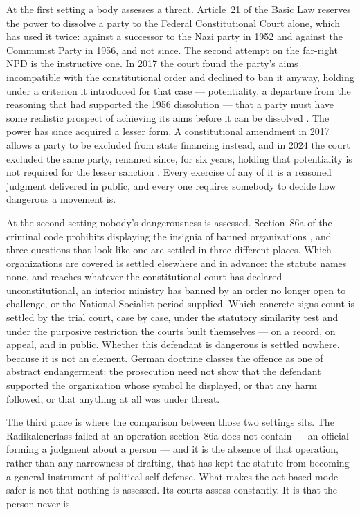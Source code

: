 At the first setting a body assesses a threat. Article~21 of the Basic Law reserves the power to dissolve a party to the Federal Constitutional Court alone, which has used it twice: against a successor to the Nazi party in 1952 and against the Communist Party in 1956, and not since. The second attempt on the far-right NPD is the instructive one. In 2017 the court found the party's aims incompatible with the constitutional
order and declined to ban it anyway, holding under a criterion it introduced for that case — potentiality, a departure from the reasoning that had supported the 1956 dissolution — that a party must have some realistic prospect of achieving its aims before it can be dissolved \autocite{bverfg2017npd,molier2018germanys}. The power has since acquired a lesser form. A constitutional amendment in 2017 allows a party to be excluded from state financing instead, and in 2024 the court excluded the same party, renamed since, for six years, holding that potentiality is not required for the lesser sanction \autocite{bverfg2024heimat}. Every exercise of any of it is a reasoned judgment delivered in public, and every one requires somebody to decide how dangerous a movement is.

At the second setting nobody's dangerousness is assessed. Section~86a of the criminal code prohibits displaying the insignia of banned organizations \autocite{germany1998stgb}, and three questions that look like one are settled in three different places. Which organizations are covered is settled elsewhere and in advance: the statute names none, and reaches whatever the constitutional court has declared unconstitutional, an interior ministry has banned by an order no longer open to challenge, or the National Socialist period supplied. Which concrete signs count is settled by the trial court, case by case, under the statutory similarity test and under the purposive restriction the courts built themselves — on a record, on appeal, and in public. Whether this defendant is dangerous is settled nowhere, because it is not an element. German doctrine classes the offence as one of abstract endangerment: the prosecution need not show that the defendant supported the organization whose symbol he displayed, or that any harm followed, or that anything at all was under threat.

The third place is where the comparison between those two settings sits. The Radikalenerlass failed at an operation section~86a does not contain — an official forming a judgment about a person — and it is the absence of that operation, rather than any narrowness of drafting, that has kept the statute from becoming a general instrument of political self-defense. What makes the act-based mode safer is not that nothing is assessed. Its courts assess constantly. It is that the person never is.

